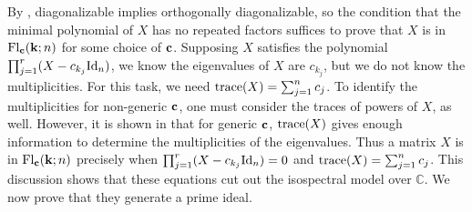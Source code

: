 \documentclass[12pt]{extarticle}
\theoremstyle{definition}
\numberwithin{theorem}{section}
\newcommand{\CC}{\mathbb{C}}
\begin{document}
By \cite[Theorem XI.4]{gantmacher}, diagonalizable implies orthogonally diagonalizable,
so the condition that the minimal polynomial of $X$ has no repeated factors suffices to prove that $X$ is in ${\rm Fl}_{\bf c}({\bf k}; n)$ for some choice of ${\bf c}$. 
Supposing $X$ satisfies the polynomial $\prod_{j=1}^r (X - c_{k_j}{\rm Id}_n)$, we know the eigenvalues of $X$ are  $c_{k_j}$, but we do not know the multiplicities. 
For this task, we need ${\rm trace}(X) = \sum_{j=1}^nc_j$. 
To identify the multiplicities for non-generic ${\bf c}$, one must consider the traces of powers of $X$, as well. 
However, it is shown in \cite{LY24b} that for generic ${\bf c}$, ${\rm trace}(X)$ gives enough information to determine the multiplicities of the eigenvalues.
Thus a matrix $X$ is in ${\rm Fl}_{\bf c}({\bf k}; n)$ precisely when $\prod_{j=1}^r (X - c_{k_j}{\rm Id}_n) = 0$ and ${\rm trace}(X) = \sum_{j=1}^nc_j$. 
This discussion shows that these equations cut out the isospectral model over $\CC$. 
We now prove that they generate a prime ideal.
\end{document}
